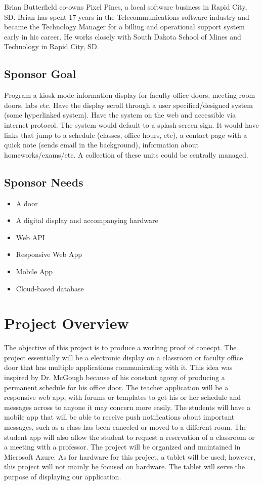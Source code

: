 \documentclass{article}
\begin{document}
Brian Butterfield co-owns Pixel Pines, a local software business in Rapid City, SD. Brian has spent 17 years in the Telecommunications software industry and became the Technology Manager for a billing and operational support system early in his career. He works closely with South Dakota School of Mines and Technology in Rapid City, SD.

\subsection*{Sponsor Goal}
Program a kiosk mode information display for faculty office doors, meeting room doors, labs etc. Have the display scroll through a user specified/designed system (some hyperlinked system). Have the system on the web and accessible via internet protocol. The system would default to a splash screen sign. It would have links that jump to a schedule (classes, office hours, etc), a contact page with a quick note (sends email in the background), information about homeworks/exams/etc. A collection of these units could be centrally managed.

\subsection*{Sponsor Needs}
\begin{itemize}
	\item A door
	\item A digital display and accompanying hardware
	\item Web API
	\item Responsive Web App
	\item Mobile App
	\item Cloud-based database
\end{itemize}

\section*{Project Overview}
The objective of this project is to produce a working proof of conecpt. The project essentially will be a electronic display on a classroom or faculty office door that has multiple applications communicating with it.   This idea was inspired by Dr. McGough because of his constant agony of producing a permanent schedule for his office door. The teacher application will be a responsive web app, with forums or templates to get his or her schedule and messages across to anyone it may concern more easily. The students will have a mobile app that will be able to receive push notifications about important messages, such as a class has been canceled or moved to a different room.  The student app will also allow the student to request a reservation of a classroom or a meeting with a professor. The project will be organized and maintained in Microsoft Azure. As for hardware for this project, a tablet will be used; however, this project will not mainly be focused on hardware. The tablet will serve the purpose of displaying our application. 
\end{document}
